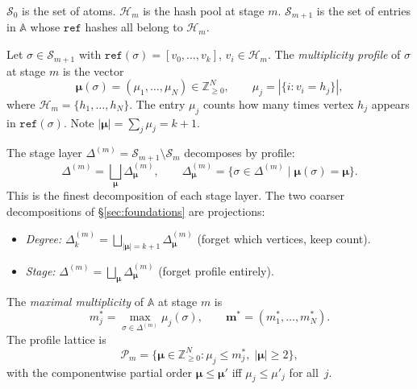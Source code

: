 $\mathcal{S}_0$ is the set of atoms. $\mathcal{H}_m$ is the hash pool at stage $m$. $\mathcal{S}_{m+1}$ is the set of entries in $\mathbb{A}$ whose $\texttt{ref}$ hashes all belong to $\mathcal{H}_m$.

\begin{definition}\label{def:profile}
Let $\sigma \in \mathcal{S}_{m+1}$ with $\texttt{ref}(\sigma) = [v_0, \ldots, v_k]$, $v_i \in \mathcal{H}_m$.
The \emph{multiplicity profile} of $\sigma$ at stage $m$ is the vector
\[
  \boldsymbol{\mu}(\sigma) = (\mu_1, \ldots, \mu_N) \in \mathbb{Z}_{\geq 0}^N, \qquad
  \mu_j = |\{i : v_i = h_j\}|,
\]
where $\mathcal{H}_m = \{h_1, \ldots, h_N\}$.
The entry $\mu_j$ counts how many times vertex $h_j$ appears in $\texttt{ref}(\sigma)$.
Note $|\boldsymbol{\mu}| = \sum_j \mu_j = k + 1$.
\end{definition}

\begin{definition}\label{def:profile-decomp}
The stage layer $\Delta^{(m)} = \mathcal{S}_{m+1} \setminus \mathcal{S}_m$ decomposes by profile:
\[
  \Delta^{(m)} = \bigsqcup_{\boldsymbol{\mu}} \Delta^{(m)}_{\boldsymbol{\mu}}, \qquad
  \Delta^{(m)}_{\boldsymbol{\mu}} = \{\sigma \in \Delta^{(m)} \mid \boldsymbol{\mu}(\sigma) = \boldsymbol{\mu}\}.
\]
This is the finest decomposition of each stage layer. The two coarser decompositions of \S\ref{sec:foundations} are projections:
\begin{itemize}
\item \emph{Degree:} $\Delta^{(m)}_k = \bigsqcup_{|\boldsymbol{\mu}| = k+1} \Delta^{(m)}_{\boldsymbol{\mu}}$ (forget which vertices, keep count).
\item \emph{Stage:} $\Delta^{(m)} = \bigsqcup_{\boldsymbol{\mu}} \Delta^{(m)}_{\boldsymbol{\mu}}$ (forget profile entirely).
\end{itemize}
\end{definition}

\begin{definition}\label{def:max-mult}
The \emph{maximal multiplicity} of $\mathbb{A}$ at stage $m$ is
\[
  m_j^* = \max_{\sigma \in \Delta^{(m)}} \mu_j(\sigma), \qquad
  \mathbf{m}^* = (m_1^*, \ldots, m_N^*).
\]
The profile lattice is
\[
  \mathcal{P}_m = \{\boldsymbol{\mu} \in \mathbb{Z}_{\geq 0}^N : \mu_j \leq m_j^*,\; |\boldsymbol{\mu}| \geq 2\},
\]
with the componentwise partial order $\boldsymbol{\mu} \leq \boldsymbol{\mu}'$ iff $\mu_j \leq \mu'_j$ for all~$j$.
\end{definition}

